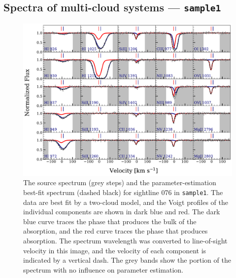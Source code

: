 \documentclass[fleqn,usenatbib]{mnras}
\begin{document}
\subsection{Spectra of multi-cloud systems --- \texttt{sample1}}
\label{s: results -- sample1}

\begin{figure}
    \centering
    \includegraphics[width=\textwidth]{figures/sample1/Models_076.pdf}
    \caption{
    The source spectrum (grey steps) and the parameter-estimation best-fit spectrum (dashed black) for sightline 076 in \texttt{sample1}.
    The data are best fit by a two-cloud model, and the Voigt profiles of the individual components are shown in dark blue and red. 
    The dark blue curve traces the phase that produces the bulk of the  absorption, and the red curve traces the phase that produces  absorption.
    The spectrum wavelength was converted to line-of-sight velocity in this image,
    and the velocity of each component is indicated by a vertical dash.
    The grey bands show the portion of the spectrum with no influence on parameter estimation.
    }
    \label{f: sample1 spectrum}
\end{figure}
\end{document}
